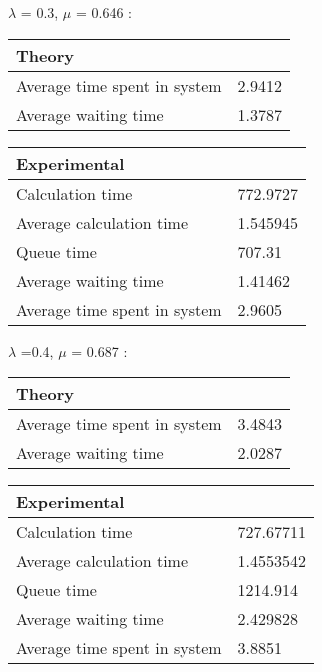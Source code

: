 \begin{minipage}{\linewidth}
    $\lambda$ = 0.3, $\mu$ = 0.646 :

    \bigskip
    \begin{minipage}{0.45\linewidth}
        \begin{tabular}{|l|l|}
            \hline
            Theory & \\
            \hline
            Average time spent in system & 2.9412 \\
            Average waiting time & 1.3787 \\
            \hline
        \end{tabular}
    \end{minipage}
    \begin{minipage}{0.45\linewidth}
        \begin{tabular}{|l|l|}
            \hline
            Experimental & \\
            \hline
            Calculation time & 772.9727 \\
            Average calculation time & 1.545945 \\
            Queue time & 707.31 \\
            Average waiting time & 1.41462 \\
            Average time spent in system & 2.9605 \\
            \hline
        \end{tabular}
    \bigskip
    \end{minipage}
\end{minipage}

\begin{minipage}{\linewidth}
    $\lambda$ =0.4, $\mu$ = 0.687 :

    \bigskip
    \begin{minipage}{0.45\linewidth}
        \begin{tabular}{|l|l|}
            \hline
            Theory & \\
            \hline
            Average time spent in system & 3.4843 \\
            Average waiting time & 2.0287 \\
            \hline
        \end{tabular}
    \end{minipage}
    \begin{minipage}{0.45\linewidth}
        \begin{tabular}{|l|l|}
            \hline
            Experimental & \\
            \hline
            Calculation time & 727.67711 \\
            Average calculation time & 1.4553542 \\
            Queue time & 1214.914 \\
            Average waiting time & 2.429828 \\
            Average time spent in system & 3.8851 \\
            \hline
        \end{tabular}
    \end{minipage}
    \bigskip
\end{minipage}

